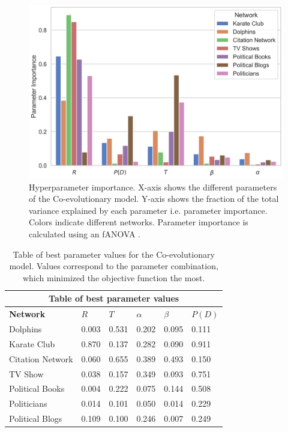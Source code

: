 \documentclass[11pt]{article}
\begin{document}
\begin{figure}[H]
    \centering
    \includegraphics[width=.9\linewidth]{../plots/overall/Parameter_Importance.png}
  \caption{Hyperparameter importance. X-axis shows the different parameters of the Co-evolutionary model. Y-axis shows the fraction of the total variance explained by each parameter i.e. parameter importance. Colors indicate different networks. Parameter importance is calculated using an fANOVA \protect\cite{hutter2014efficient}.}
  \label{fig:eval_importance}
\end{figure}

\begin{table}[H]
\begin{center}
    
\begin{tabular}{ |p{3cm}||p{2cm}|p{2cm}|p{2cm}|p{2cm}|p{2cm}|}
    \hline
    \multicolumn{6}{|c|}{Table of best parameter values} \\
    \hline
    \bf{Network} & $R$ & $T$ & $\alpha$ & $\beta$ & $P(D)$\\
    \hline
    Dolphins   & 0.003    &0.531&   0.202&   0.095&   0.111\\
    Karate Club&   0.870  & 0.137   &0.282&   0.090&   0.911\\
    Citation Network   &0.060 & 0.655&  0.389&   0.493&   0.150\\
    TV Show & 0.038 & 0.157 & 0.349 & 0.093 & 0.751 \\
    Political Books &0.004 & 0.222&  0.075&   0.144&   0.508\\
    Politicians&   0.014  & 0.101 &0.050&   0.014&   0.229\\
    Political Blogs & 0.109  & 0.100   &0.246&   0.007&   0.249\\
    \hline
\end{tabular}
\end{center}
\caption{Table of best parameter values for the Co-evolutionary model. Values correspond to the parameter combination, which minimized the objective function the most.}
\label{table:best_params}
\end{table}
\end{document}
